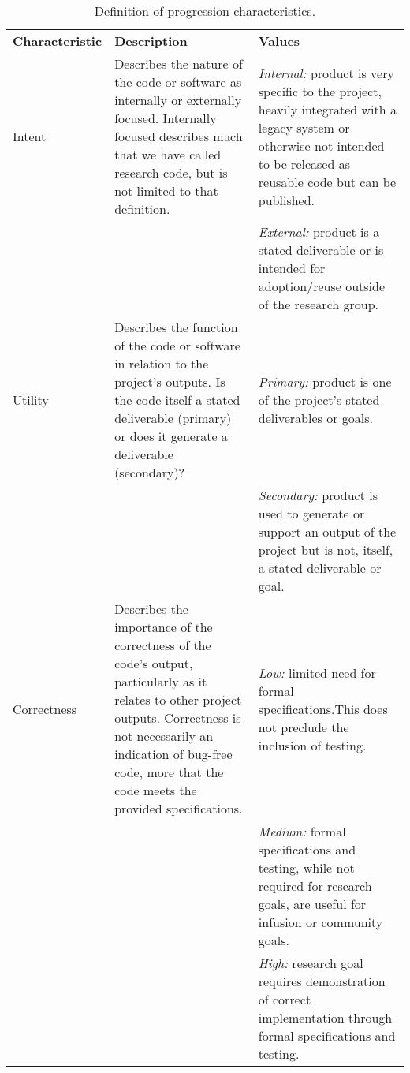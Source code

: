 \documentclass{article}
\begin{document}
\FloatBarrier\clearpage
\begin{table}[!hbp]
\caption{Definition of progression characteristics.}
\centering
\small
\begin{tabularx}{\textwidth}{lXX}
\hline
\textbf{Characteristic} & \textbf{Description} & \textbf{Values} \\ \cline{1-3}

Intent & Describes the nature of the code or software as internally or externally focused. Internally focused describes much that we have called research code, but is not limited to that definition. & \textit{Internal:} product is very specific to the project, heavily integrated with a legacy system or otherwise not intended to be released as reusable code but can be published. \\
& & \textit{External:} product is a stated deliverable or is intended for adoption/reuse outside of the research group. \\ \cline{1-3}

Utility & Describes the function of the code or software in relation to the project’s outputs. Is the code itself a stated deliverable (primary) or does it generate a deliverable (secondary)? & \textit{Primary:} product is one of the project’s stated deliverables or goals. \\
& & \textit{Secondary:} product is used to generate or support an output of the project but is not, itself, a stated deliverable or goal. \\ \cline{1-3}

Correctness & Describes the importance of the correctness of the code’s output, particularly as it relates to other project outputs. Correctness is not necessarily an indication of bug-free code, more that the code meets the provided specifications. & \textit{Low:} limited need for formal specifications.This does not preclude the inclusion of testing. \\
& & \textit{Medium:} formal specifications and testing, while not required for research goals, are useful for infusion or community goals. \\
& & \textit{High:} research goal requires demonstration of correct implementation through formal specifications and testing. \\ \cline{1-3}


\end{tabularx}
\end{table}
\end{document}
